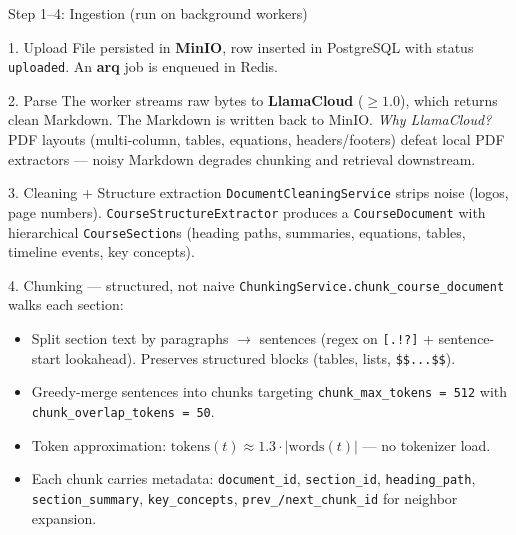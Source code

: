 \documentclass[aspectratio=169, 10pt]{beamer}
\begin{document}
\begin{frame}{Step 1--4: Ingestion (run on background workers)}
  \scriptsize
  \begin{block}{1. Upload}
    File persisted in \textbf{MinIO}, row inserted in PostgreSQL with status
    \texttt{uploaded}. An \textbf{arq} job is enqueued in Redis.
  \end{block}

  \begin{block}{2. Parse}
    The worker streams raw bytes to \textbf{LlamaCloud} ($\geq 1.0$),
    which returns clean Markdown. The Markdown is written back to MinIO.
    \textit{Why LlamaCloud?} PDF layouts (multi-column, tables, equations,
    headers/footers) defeat local PDF extractors --- noisy Markdown
    degrades chunking and retrieval downstream.
  \end{block}

  \begin{block}{3. Cleaning + Structure extraction}
    \texttt{DocumentCleaningService} strips noise (logos, page numbers).
    \texttt{CourseStructureExtractor} produces a \texttt{CourseDocument}
    with hierarchical \texttt{CourseSection}s (heading paths, summaries,
    equations, tables, timeline events, key concepts).
  \end{block}

  \begin{block}{4. Chunking --- structured, not naive}
    \texttt{ChunkingService.chunk\_course\_document} walks each section:
    \begin{itemize}
      \setlength\itemsep{0pt}
      \item Split section text by paragraphs $\to$ sentences (regex on
            \texttt{[.!?]} + sentence-start lookahead). Preserves structured blocks (tables, lists, \texttt{\$\$...\$\$}).
      \item Greedy-merge sentences into chunks targeting
            \texttt{chunk\_max\_tokens = 512} with
            \texttt{chunk\_overlap\_tokens = 50}.
      \item Token approximation: $\mathrm{tokens}(t) \approx 1.3 \cdot |\mathrm{words}(t)|$ --- no tokenizer load.
      \item Each chunk carries metadata: \texttt{document\_id},
            \texttt{section\_id}, \texttt{heading\_path},
            \texttt{section\_summary}, \texttt{key\_concepts},
            \texttt{prev\_/next\_chunk\_id} for neighbor expansion.
    \end{itemize}
  \end{block}
\end{frame}
\end{document}
